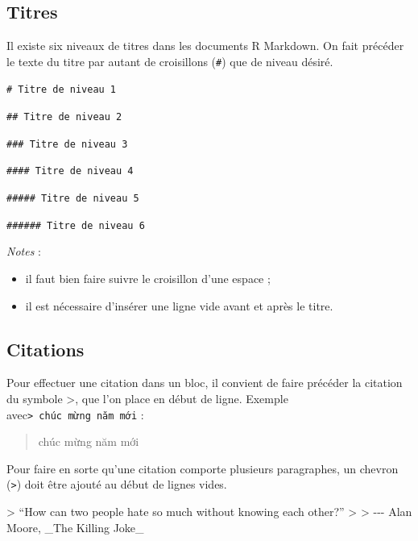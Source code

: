 \documentclass[
  11pt,
]{book}
\newenvironment{Shaded}{\begin{snugshade}}{\end{snugshade}}
\newcommand{\AttributeTok}[1]{\textcolor[rgb]{0.13,0.29,0.53}{#1}}
\providecommand{\tightlist}{%
  \setlength{\itemsep}{0pt}\setlength{\parskip}{0pt}}
\numberwithin{equation}{section}
\numberwithin{countremarque}{section}
\newenvironment{notebox}{
  \begin{tcolorbox}[breakable, colback=jaune,coltext=black,
                  colframe=grisfonce]}
 {\end{tcolorbox}}
\begin{document}
\hypertarget{titres}{%
\subsection{Titres}\label{titres}}

Il existe six niveaux de titres dans les documents R Markdown. On fait précéder le texte du titre par autant de croisillons (\texttt{\#}) que de niveau désiré.

\texttt{\#\ Titre\ de\ niveau\ 1}

\texttt{\#\#\ Titre\ de\ niveau\ 2}

\texttt{\#\#\#\ Titre\ de\ niveau\ 3}

\texttt{\#\#\#\#\ Titre\ de\ niveau\ 4}

\texttt{\#\#\#\#\#\ Titre\ de\ niveau\ 5}

\texttt{\#\#\#\#\#\#\ Titre\ de\ niveau\ 6}

\begin{notebox}

\emph{Notes} :

\begin{itemize}
\tightlist
\item
  il faut bien faire suivre le croisillon d'une espace ;
\item
  il est nécessaire d'insérer une ligne vide avant et après le titre.
\end{itemize}

\end{notebox}

\hypertarget{citations}{%
\subsection{Citations}\label{citations}}

Pour effectuer une citation dans un bloc, il convient de faire précéder la citation du symbole \textgreater, que l'on place en début de ligne. Exemple avec\texttt{\textgreater{}\ chúc\ mừng\ năm\ mới} :

\begin{quote}
chúc mừng năm mới
\end{quote}

Pour faire en sorte qu'une citation comporte plusieurs paragraphes, un chevron (\texttt{\textgreater{}}) doit être ajouté au début de lignes vides.

\begin{Shaded}
\begin{Highlighting}[]
\AttributeTok{\textgreater{} “How can two people hate so much without knowing each other?”}
\AttributeTok{\textgreater{}}
\AttributeTok{\textgreater{} {-}{-}{-} Alan Moore, \_The Killing Joke\_}
\end{Highlighting}
\end{Shaded}
\end{document}

